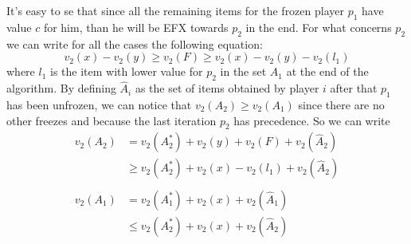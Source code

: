 \documentclass{article}
\begin{document}
It's easy to se that since all the remaining items for the frozen player $p_1$ have value $c$ for him, than he will be EFX towards $p_2$ in the end. For what concerns $p_2$ we can write for all the cases the following equation:
\begin{equation*}
    v_2(x) - v_2(y) \ge v_2(F) \ge v_2(x) - v_2(y) - v_2(l_1)
\end{equation*}
where $l_1$ is the item with lower value for $p_2$ in the set $A_1$ at the end of the algorithm. By defining $\hat A_i$ as the set of items obtained by player $i$ after that $p_1$ has been unfrozen, we can notice that $v_2(A_2) \ge v_2(A_1)$ since there are no other freezes and because the last iteration $p_2$ has precedence.
So we can write 
\begin{align*}
    v_2(A_2) &=v_2(A_2^*) +  v_2(y) + v_2(F) + v_2(\hat A_2)\\
    & \ge  v_2(A_2^*) +  v_2(x) - v_2(l_1) + v_2(\hat A_2)\\\\
    v_2(A_1)& = v_2(A_1^*) + v_2(x) + v_2(\hat A_1)\\
    &\le v_2(A_2^*) + v_2(x) + v_2(\hat A_2)
\end{align*}
\end{document}
